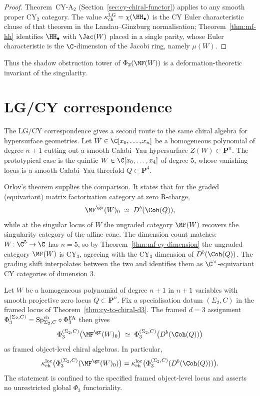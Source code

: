 \begin{proof}
Theorem~CY-A$_2$ (Section~\ref{sec:cy-chiral-functor}) applies to any smooth proper CY$_2$ category. The value $\kappa_{\mathrm{ch}}^{\mathrm{LG}} = \chi(\HH_\bullet)$ is the CY Euler characteristic clause of that theorem in the Landau--Ginzburg normalisation; Theorem~\ref{thm:mf-hh} identifies $\HH_\bullet$ with $\Jac(W)$ placed in a single parity, whose Euler characteristic is the $\C$-dimension of the Jacobi ring, namely $\mu(W)$.
\end{proof}

Thus the shadow obstruction tower of $\Phi_2(\MF(W))$ is a deformation-theoretic invariant of the singularity.

\section{LG/CY correspondence}
\label{sec:lg-cy-correspondence}

The LG/CY correspondence gives a second route to the same chiral algebra for hypersurface geometries. Let $W \in \C[x_0, \ldots, x_n]$ be a homogeneous polynomial of degree $n + 1$ cutting out a smooth Calabi--Yau hypersurface $Z(W) \subset \mathbf{P}^n$. The prototypical case is the quintic $W \in \C[x_0, \ldots, x_4]$ of degree $5$, whose vanishing locus is a smooth Calabi--Yau threefold $Q \subset \mathbf{P}^4$.

Orlov's theorem \cite{Orlov2004} supplies the comparison. It states that for the graded (equivariant) matrix factorization category at zero R-charge,
\[
 \MF^{\gr}(W)_{0} \;\simeq\; D^b(\Coh(Q)) ,
\]
while at the singular locus of $W$ the ungraded category $\MF(W)$ recovers the singularity category of the affine cone. The dimension count matches: $W \colon \C^5 \to \C$ has $n = 5$, so by Theorem~\ref{thm:mf-cy-dimension} the ungraded category $\MF(W)$ is CY$_3$, agreeing with the CY$_3$ dimension of $D^b(\Coh(Q))$. The grading shift interpolates between the two and identifies them as $\C^\times$-equivariant CY categories of dimension $3$.

\begin{proposition}
\label{prop:lg-cy-matching}
Let $W$ be a homogeneous polynomial of degree $n + 1$ in $n + 1$ variables with smooth projective zero locus $Q \subset \mathbf{P}^n$. Fix a specialisation datum $(\Sigma_2,C)$ in the framed locus of Theorem~\ref{thm:cy-to-chiral-d3}. The framed $d = 3$ assignment
$\Phi_3^{(\Sigma_2,C)}=\mathrm{Sp}^{\mathrm{ch}}_{\Sigma_2,C}\circ\Phi^{\mathrm{FA}}_3$ then gives
\[
 \Phi_3^{(\Sigma_2,C)}\bigl(\MF^{\gr}(W)_{0}\bigr) \;\simeq\; \Phi_3^{(\Sigma_2,C)}\bigl(D^b(\Coh(Q))\bigr)
\]
as framed object-level chiral algebras. In particular,
\[
\kappa_{\mathrm{ch}}^{\mathrm{loc}}\bigl(\Phi_3^{(\Sigma_2,C)}(\MF^{\gr}(W)_0)\bigr)
=
\kappa_{\mathrm{ch}}^{\mathrm{loc}}\bigl(\Phi_3^{(\Sigma_2,C)}(D^b(\Coh(Q)))\bigr).
\]
The statement is confined to the specified framed object-level locus and asserts no unrestricted global $\Phi_3$ functoriality.
\end{proposition}

